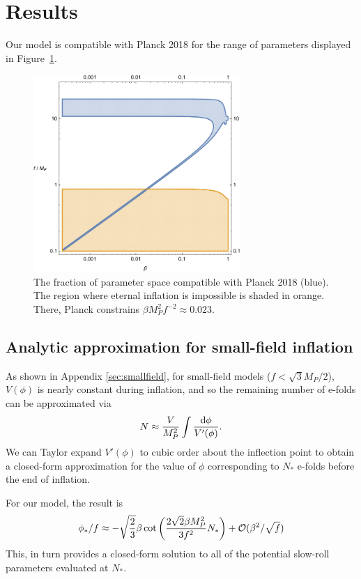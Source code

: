 \documentclass[aps,amsfonts,amsmath,prd,preprint,nofootinbib,superscriptaddress]{revtex4}
\newcommand{\Mp}{{M_{P}}}
\newcommand{\MMp}{{M_P^2}}
\newcommand{\rmd}{{\rm d}}
\begin{document}
\section{Results}

Our model is compatible with Planck 2018 for the range of parameters displayed in Figure~\ref{fig:parameters}.  

\begin{figure}[!h]
  \centering
    \includegraphics[width=0.7\textwidth]{figures/fbregionPlanck2018.pdf}
    \caption{The fraction of parameter space compatible with Planck 2018 (blue).  The region where eternal inflation is impossible is shaded in orange.  There, Planck constrains $\beta \MMp f^{-2} \approx 0.023$.}\label{fig:parameters}
\end{figure}



\subsection{Analytic approximation for small-field inflation}
As shown in Appendix \ref{sec:smallfield}, for small-field models ($f < \sqrt{3}\Mp/2$), $V(\phi)$ is nearly constant during inflation, and so the remaining number of e-folds can be approximated via
\begin{align}
N \approx \frac{V}{\MMp}\int\frac{\rmd\phi}{V'(\phi)}.
\end{align}
We can Taylor expand $V'(\phi)$ to cubic order about the inflection point to obtain a closed-form approximation for the value of $\phi$ corresponding to $N_\ast$ e-folds before the end of inflation.


For our model, the result is
\begin{align}
\phi_\ast/f \approx -\sqrt{\frac{2}{3}}\beta \cot\left(\frac{2\sqrt{2}\beta\MMp}{3f^2}N_\ast\right) + {\cal O}(\beta^2/\sqrt{f})
\end{align}  
This, in turn provides a closed-form solution to all of the potential slow-roll parameters
evaluated at $N_\ast$.
\end{document}
